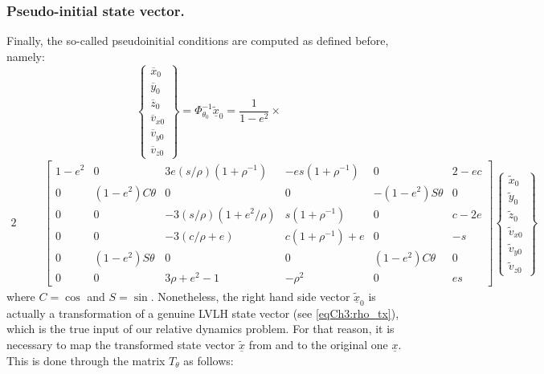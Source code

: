		\subsubsection{Pseudo-initial state vector.}
		\indent Finally, the so-called pseudoinitial conditions are computed as defined before, namely:
		\[
		\left\{
		\begin{array}{c}
		\overline{x}_0 \\
		\overline{y}_0 \\
		\overline{z}_0 \\
		\overline{v}_{x0} \\
		\overline{v}_{y0} \\
		\overline{v}_{z0} 
		\end{array}
		\right\} =
		\Phi_{\theta_0}^{-1} \widetilde{\underline{x}}_0 = 
		\dfrac{1}{1 - e^2} \times
		\]
		\begin{alignat}{2}
		&\label{eqCh3: Pseudo_ICs}&&\left[
		\begin{array}{cccccc}
		1 - e^2	&    0 					&  3 e  (s/\rho)  (1 + \rho^{-1})		& -e s  (1 + \rho^{-1})	&    0						&                 2 - e c\\
        0		&  (1 - e^2) C\theta	&         0							&                 0		&  -(1 - e^2) S\theta 	&              0\\
        0 		&  	0					&     -3  (s/\rho)  (1 + e^2/\rho)	&   s  (1 + \rho^{-1})	&    0						&              c - 2e	\\
        0		&    0					&          -3  (c/\rho + e)			&  c  (1 + \rho^{-1}) + e	&    0						&      -s 		\\
        0		& (1 - e^2) S\theta 	&                0 					&                 0		&  (1 - e^2) C\theta 	&                              0\\
        0		&	0 					&             3  \rho + e^2 - 1		&           -\rho^2 	&    0						& e s
		\end{array}
		\right]
		\left\{
		\begin{array}{c}
		\widetilde{x}_0 \\
		\widetilde{y}_0 \\
		\widetilde{z}_0 \\
		\widetilde{v}_{x0} \\
		\widetilde{v}_{y0} \\
		\widetilde{v}_{z0} 
		\end{array}
		\right\}
		\end{alignat}
		\noindent where $C = \cos$ and $S = \sin$. Nonetheless, the right hand side vector $\underline{\widetilde{x}}_0$ is actually a transformation of a genuine LVLH state vector (see \eqref{eqCh3:rho_tx}), which is the true input of our relative dynamics problem. For that reason, it is necessary to map the transformed state vector $\underline{\widetilde{x}}$ from and to the original one $\underline{x}$. This is done through the matrix $T_{\theta}$ as follows:
